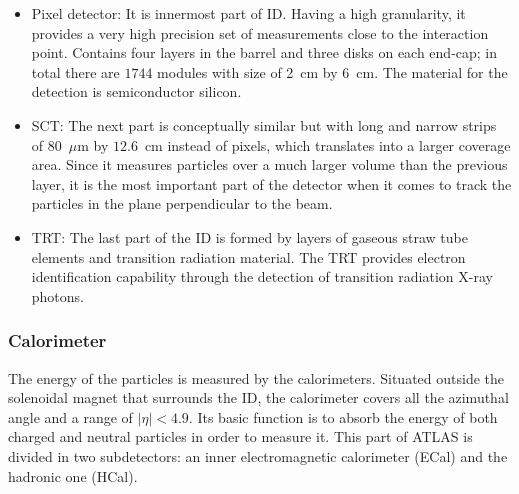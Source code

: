 \begin{itemize}
\item Pixel detector: It is innermost part of ID. Having a high granularity, it provides a very high precision set of measurements close to the interaction point. Contains four layers in the barrel and three disks on each end-cap; in total there are $1744$ modules with size of 2~cm by 6~cm. The material for the detection is semiconductor silicon.
\item SCT: The next part is conceptually similar but with long and narrow strips of 80~$\mu$m by $12.6$~cm instead of pixels, which translates into a larger coverage area. Since it measures particles over a much larger volume than the previous layer, it is the most important part of the detector when it comes to track the particles in the plane perpendicular to the beam.
\item TRT: The last part of the ID is formed by layers of gaseous straw tube elements and transition radiation material. The TRT provides electron identification capability through the detection of transition radiation X-ray photons.
\end{itemize}

\subsubsection*{Calorimeter}
The energy of the particles is measured by the calorimeters. Situated outside the solenoidal magnet that surrounds the ID, the calorimeter covers all the azimuthal angle and a range of $|\eta|<4.9$. Its basic function is to absorb the energy of both charged and neutral particles in order to measure it. This part of ATLAS is divided in two subdetectors: an inner electromagnetic calorimeter (ECal) and the hadronic one (HCal).

